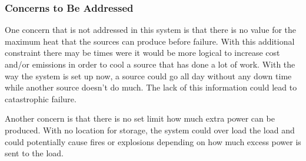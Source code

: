 \documentclass{article}
\begin{document}
    \subsubsection{Concerns to Be Addressed}
    One concern that is not addressed in this system is that there is no value for the maximum heat that the sources can produce before failure.  With this additional constraint there may be times were it would be more logical to increase cost and/or emissions in order to cool a source that has done a lot of work.  With the way the system is set up now, a source could go all day without any down time while another source doesn't do much.  The lack of this information could lead to catastrophic failure.

    Another concern is that there is no set limit how much extra power can be produced.  With no location for storage, the system could over load the load and could potentially cause fires or explosions depending on how much excess power is sent to the load.
\end{document}
